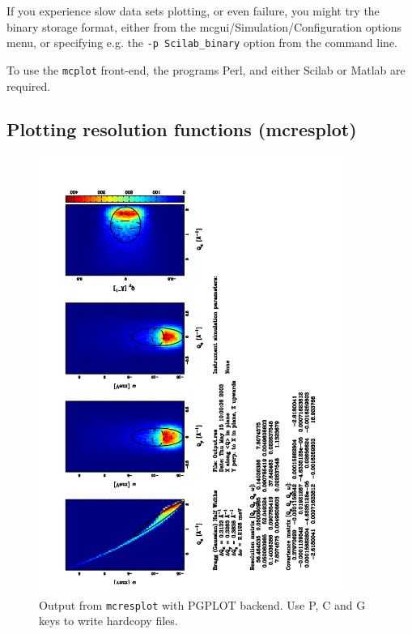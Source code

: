 If you experience slow data sets plotting, or even failure, you might try the binary storage format, either from the mcgui/Simulation/Configuration options menu, or specifying e.g. the \verb+-p Scilab_binary+ option from the command line.

To use the \verb+mcplot+ front-end, the programs Perl, and either Scilab or Matlab are required.  


\subsection{Plotting resolution functions (mcresplot)}
\label{s:mcresplot}

\begin{figure}[htb!]
  \begin{center}
    \includegraphics[angle=-90,width=0.9\textwidth]{figures/mcresplot_PGPLOT}
  \end{center}
\caption{Output from \texttt{mcresplot} with PGPLOT backend.
  Use P, C and G keys to write hardcopy files.}
\label{fig:mcresplot_PGPLOT}
\end{figure}

